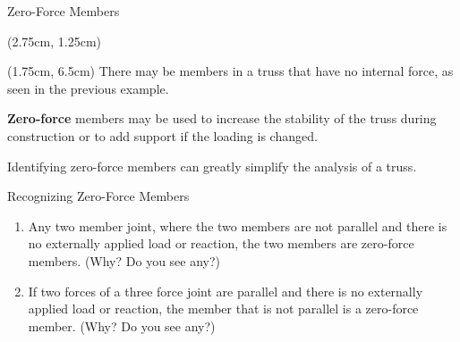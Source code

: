 \documentclass[9pt, xcolor={svgnames, x11names},professionalfonts]{beamer}
\def\scale{1}
\begin{document}
\begin{frame}{Zero-Force Members}
	\begin{textblock*}{0.7\textwidth}(2.75cm, 1.25cm)
		\begin{statsbox}{}{}
			\centering
			\small
			\def\scale{0.55}
			
		\end{statsbox}
	\end{textblock*}

	\begin{textblock*}{0.9\textwidth}(1.75cm, 6.5cm)
		There may be members in a truss that have no internal force, as seen in the previous example.\par
		\textbf{Zero-force} members may be used to increase the stability of the truss during construction or to add support
		if the loading is changed.\par
		Identifying zero-force members can greatly simplify the analysis of a truss.
	\end{textblock*}
\end{frame}


\begin{frame}{Recognizing Zero-Force Members}
		\begin{statsbox}{}{}
			\centering
			\small
			\def\scale{0.75}
			
		\end{statsbox}
		\begin{enumerate}
			\item<1-> Any two member joint, where the two members are not parallel and there is no externally applied load or reaction, the two members are zero-force members. (Why? Do you see any?)\parm
			\item<3-> If two forces of a three force joint are parallel and there is no externally applied load or reaction, the member that is not parallel is a zero-force member. (Why? Do you see any?)
		\end{enumerate}
		\uncover<5->{
			\centering
			Any more?
		}
			


\end{frame}

\end{document}
